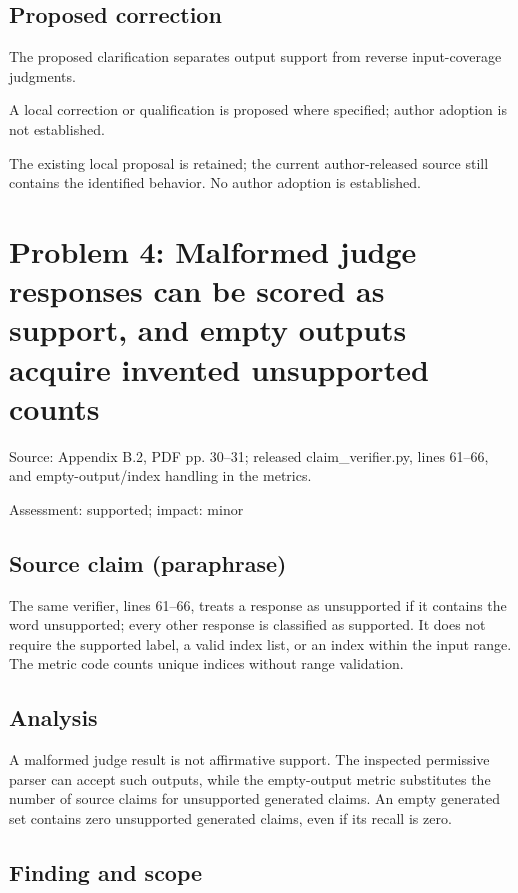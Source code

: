 \documentclass[11pt]{article}
\begin{document}
\subsection*{Proposed correction}

The proposed clarification separates output support from reverse input-coverage judgments.

A local correction or qualification is proposed where specified; author adoption is not established.

The existing local proposal is retained; the current author-released source still contains the identified behavior. No author adoption is established.

\section*{Problem 4: Malformed judge responses can be scored as support, and empty outputs acquire invented unsupported counts}

Source: Appendix B.2, PDF pp. 30–31; released claim\_verifier.py, lines 61–66, and empty-output/index handling in the metrics.

Assessment: supported; impact: minor

\subsection*{Source claim (paraphrase)}

The same verifier, lines 61–66, treats a response as unsupported if it contains the word unsupported; every other response is classified as supported. It does not require the supported label, a valid index list, or an index within the input range. The metric code counts unique indices without range validation.

\subsection*{Analysis}

A malformed judge result is not affirmative support. The inspected permissive parser can accept such outputs, while the empty-output metric substitutes the number of source claims for unsupported generated claims. An empty generated set contains zero unsupported generated claims, even if its recall is zero.

\subsection*{Finding and scope}
\end{document}
